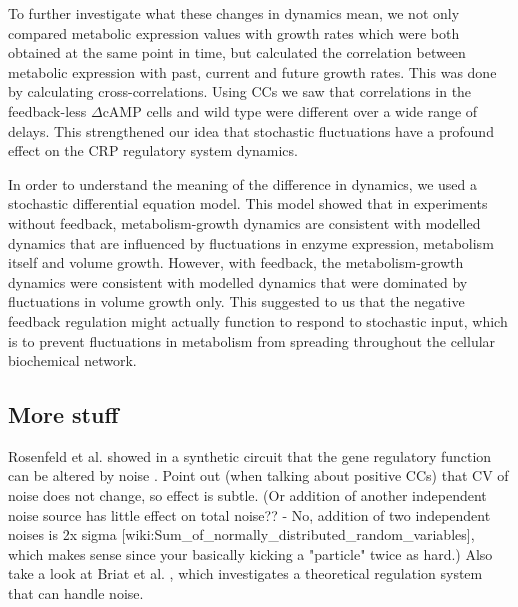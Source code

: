 To further investigate what these changes in dynamics mean, 
we not only compared metabolic expression values with growth rates which were both obtained at the same point in time,
but calculated the correlation between metabolic expression with past, current and future growth rates.
%
This was done by calculating cross-correlations.
%
Using CCs we saw that correlations in the feedback-less $\Delta$cAMP cells and wild type were different over a wide range of delays.
%
This strengthened our idea that stochastic fluctuations have a profound effect on the CRP regulatory system dynamics.

In order to understand the meaning of the difference in dynamics, we used a stochastic differential equation model.
%
This model showed that in experiments without feedback, metabolism-growth dynamics are consistent with modelled dynamics that are influenced by fluctuations in enzyme expression, metabolism itself and volume growth.
% 
However, with feedback, the metabolism-growth dynamics were consistent with modelled dynamics that were dominated by fluctuations in volume growth only.
%
This suggested to us that the negative feedback regulation might actually function to respond to stochastic input, which is 
to prevent fluctuations in metabolism from spreading throughout the cellular biochemical network.



\subsection*{More stuff}
Rosenfeld et al. showed in a synthetic circuit that the gene regulatory function can be altered by noise \cite{Rosenfeld2005}.
%
Point out (when talking about positive CCs) that CV of noise does not change, so effect is subtle.
(Or addition of another independent noise source has little effect on total noise?? - No, addition of two independent noises is 2x sigma [wiki:Sum\_of\_normally\_distributed\_random\_variables], which makes sense since your basically kicking a "particle" twice as hard.)
%
Also take a look at Briat et al. \cite{Briat2016}, which investigates a theoretical regulation system that can handle noise.
